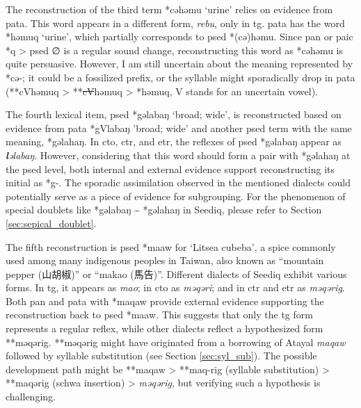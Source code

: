 The reconstruction of the third term *cəhəmu `urine' relies on evidence from \acl{pata}. This word appears in a different form, \textit{rebu}, only in \acl{tg}. \acl{pata} has the word *həmuq `urine', which partially corresponds to \acl{psed} *(cə)həmu. Since \acl{pan} or \acl{paic} *q > \acl{psed} ∅ is a regular sound change, reconstructing this word as *cəhəmu is quite persuasive. However, I am still uncertain about the meaning represented by *cə-; it could be a fossilized prefix, or the syllable might sporadically drop in \acl{pata} (**cVhəmuq > **\sout{cV}həmuq > *həmuq, V stands for an uncertain vowel).

The fourth lexical item, \acl{psed} *gəlabaŋ `broad; wide', is reconstructed based on evidence from \acl{pata} *gVlabaŋ 'broad; wide' and another \acs{psed} term with the same meaning, *gəlahaŋ. In \acl{cto}, \acl{ctr}, and \acl{etr}, the reflexes of \acl{psed} *gəlabaŋ appear as \textit{\textbf{l}əlabaŋ}. However, considering that this word should form a pair with *gəlahaŋ at the \acl{psed} level, both internal and external evidence support reconstructing its initial as *g-. The sporadic assimilation observed in the mentioned dialects could potentially serve as a piece of evidence for subgrouping. For the phenomenon of special doublets like *gəlabaŋ \~{} *gəlahaŋ in Seediq, please refer to Section \ref{sec:sepical_doublet}.

The fifth reconstruction is \acl{psed} *maaw for `Litsea cubeba', a spice commonly used among many indigenous peoples in Taiwan, also known as ``mountain pepper (山胡椒)'' or ``makao (馬告)''. Different dialects of Seediq exhibit various forms. In \acl{tg}, it appears as \textit{mao}; in \acl{cto} as \textit{məqəri}; and in \acl{ctr} and \acl{etr} as \textit{məqərig}. Both \acl{pan} and \acl{pata} with *maqaw provide external evidence supporting the reconstruction back to \acl{psed} *maaw. This suggests that only the \acl{tg} form represents a regular reflex, while other dialects reflect a hypothesized form **məqərig. **məqərig might have originated from a borrowing of Atayal \textit{maqaw} followed by syllable substitution (see Section \ref{sec:syl_sub}). The possible development path might be **maqaw > **maq-rig (syllable substitution) > **maqərig (schwa insertion) > \textit{məqərig}, but verifying such a hypothesis is challenging.


